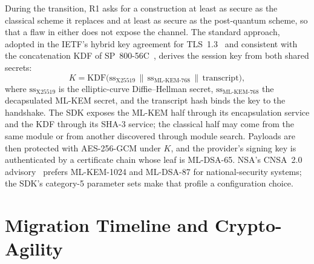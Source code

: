 During the transition, R1 asks for a construction at least as secure as the classical scheme it replaces and at least as secure as the post-quantum scheme, so that a flaw in either does not expose the channel. The standard approach, adopted in the IETF's hybrid key agreement for TLS~1.3~\cite{kwiatkowski2025hybridtls} and consistent with the concatenation KDF of SP~800-56C~\cite{nist2020sp80056c}, derives the session key from both shared secrets:
\begin{equation}\label{eq:pqc:hybrid}
K = \mathrm{KDF}\bigl(\mathrm{ss}_{\text{X25519}} \,\|\, \mathrm{ss}_{\text{ML-KEM-768}} \,\|\, \mathrm{transcript}\bigr),
\end{equation}
where $\mathrm{ss}_{\text{X25519}}$ is the elliptic-curve Diffie--Hellman secret, $\mathrm{ss}_{\text{ML-KEM-768}}$ the decapsulated ML-KEM secret, and the transcript hash binds the key to the handshake. The SDK exposes the ML-KEM half through its encapsulation service and the KDF through its SHA-3 service; the classical half may come from the same module or from another discovered through module search. Payloads are then protected with AES-256-GCM under $K$, and the provider's signing key is authenticated by a certificate chain whose leaf is ML-DSA-65. NSA's CNSA~2.0 advisory~\cite{nsa2022cnsa2} prefers ML-KEM-1024 and ML-DSA-87 for national-security systems; the SDK's category-5 parameter sets make that profile a configuration choice.

\section{Migration Timeline and Crypto-Agility}\label{sec:pqc:timeline}


